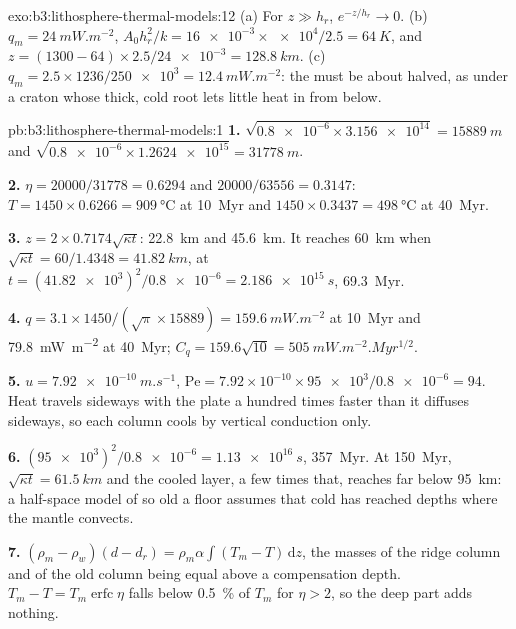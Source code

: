\begin{solution}{exo:b3:lithosphere-thermal-models:12}
(a) For $z \gg h_r$, $e^{-z/h_r} \to 0$. (b) $q_m = \qty{24}{mW.m^{-2}}$,
$A_0h_r^2/k = \num{16e-3}\times\num{e4}/2.5 = \qty{64}{K}$, and $z = (1300 -
64)\times2.5/\num{24e-3} = \qty{128.8}{km}$. (c) $q_m = 2.5\times1236/\num{250e3}
= \qty{12.4}{mW.m^{-2}}$: the  must be about halved, as under a
craton whose thick, cold root lets little heat in from below.
\end{solution}

\begin{solution}{pb:b3:lithosphere-thermal-models:1}
\textbf{1.} $\sqrt{\num{0.8e-6}\times\num{3.156e14}} = \qty{15889}{m}$ and
$\sqrt{\num{0.8e-6}\times\num{1.2624e15}} = \qty{31778}{m}$.

\textbf{2.} $\eta = 20000/31778 = 0.6294$ and $20000/63556 = 0.3147$:
$T = 1450\times0.6266 = \qty{909}{\celsius}$ at \qty{10}{Myr} and
$1450\times0.3437 = \qty{498}{\celsius}$ at \qty{40}{Myr}.

\textbf{3.} $z = 2\times0.7174\sqrt{\kappa t}$: \qty{22.8}{km} and
\qty{45.6}{km}. It reaches \qty{60}{km} when $\sqrt{\kappa t} = 60/1.4348 =
\qty{41.82}{km}$, at $t = (\num{41.82e3})^2/\num{0.8e-6} = \qty{2.186e15}{s}$,
\qty{69.3}{Myr}.

\textbf{4.} $q = 3.1\times1450/(\sqrt\pi\times15889) = \qty{159.6}{mW.m^{-2}}$ at
\qty{10}{Myr} and \qty{79.8}{mW.m^{-2}} at \qty{40}{Myr}; $C_q = 159.6\sqrt{10}
= \qty{505}{mW.m^{-2}.Myr^{1/2}}$.

\textbf{5.} $u = \qty{7.92e-10}{m.s^{-1}}$, $\mathrm{Pe} = 7.92\times10^{-10}
\times\num{95e3}/\num{0.8e-6} = 94$. Heat travels sideways with the plate a
hundred times faster than it diffuses sideways, so each column cools by
vertical conduction only.

\textbf{6.} $(\num{95e3})^2/\num{0.8e-6} = \qty{1.13e16}{s}$, \qty{357}{Myr}.
At \qty{150}{Myr}, $\sqrt{\kappa t} = \qty{61.5}{km}$ and the cooled layer, a
few times that, reaches far below \qty{95}{km}: a half-space model of so old a
floor assumes that cold has reached depths where the mantle convects.

\textbf{7.} $(\rho_m - \rho_w)(d - d_r) = \rho_m\alpha\int(T_m - T)\,\mathrm dz$,
the masses of the ridge column and of the old column being equal above a
compensation depth. $T_m - T = T_m\operatorname{erfc}\eta$ falls below
\qty{0.5}{\percent} of $T_m$ for $\eta > 2$, so the deep part adds nothing.


\end{solution}
